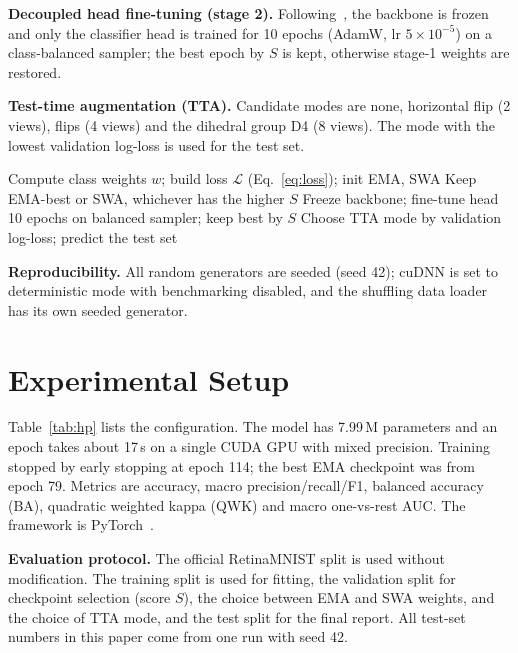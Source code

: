 \documentclass[10pt,twocolumn]{article}
\begin{document}
\textbf{Decoupled head fine-tuning (stage 2).} Following~\cite{decouple}, the backbone is frozen and only the classifier head is trained for 10 epochs (AdamW, lr $5{\times}10^{-5}$) on a class-balanced sampler; the best epoch by $S$ is kept, otherwise stage-1 weights are restored.

\textbf{Test-time augmentation (TTA).} Candidate modes are none, horizontal flip (2 views), flips (4 views) and the dihedral group D4 (8 views). The mode with the lowest validation log-loss is used for the test set.

\begin{algorithm}[t]
\small
\DontPrintSemicolon
\SetAlgoLined
\caption{Two-stage training and inference}\label{alg:train}
Compute class weights $w$; build loss $\mathcal{L}$ (Eq.~\ref{eq:loss}); init EMA, SWA\;
Keep EMA-best or SWA, whichever has the higher $S$\;
Freeze backbone; fine-tune head 10 epochs on balanced sampler; keep best by $S$\;
Choose TTA mode by validation log-loss; predict the test set\;
\end{algorithm}

\textbf{Reproducibility.} All random generators are seeded (seed 42); cuDNN is set to deterministic mode with benchmarking disabled, and the shuffling data loader has its own seeded generator.

\section{Experimental Setup}\label{sec:exp}
Table~\ref{tab:hp} lists the configuration. The model has 7.99\,M parameters and an epoch takes about 17\,s on a single CUDA GPU with mixed precision. Training stopped by early stopping at epoch 114; the best EMA checkpoint was from epoch 79. Metrics are accuracy, macro precision/recall/F1, balanced accuracy (BA), quadratic weighted kappa (QWK) and macro one-vs-rest AUC. The framework is PyTorch~\cite{pytorch}.

\textbf{Evaluation protocol.} The official RetinaMNIST split is used without modification. The training split is used for fitting, the validation split for checkpoint selection (score $S$), the choice between EMA and SWA weights, and the choice of TTA mode, and the test split for the final report. All test-set numbers in this paper come from one run with seed 42.
\end{document}
